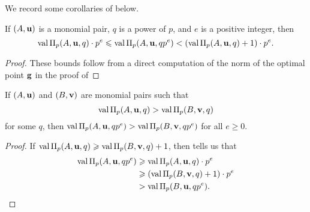 \documentclass[11pt]{amsart}
\begin{document}

We record some corollaries of  below.


\begin{corollary}
   \label{natural bounds: C}
   If $(A, \mathbf{u})$ is a monomial pair, $q$ is a power of $p$, and $e$ is a positive integer, then
   \[ \operatorname{val} \Pi_p(A, \mathbf{u}, q) \cdot p^e \leqslant \operatorname{val} \Pi_p(A, \mathbf{u}, qp^e) < (\operatorname{val} \Pi_p(A, \mathbf{u}, q) +1) \cdot p^e. \]
\end{corollary}
\begin{proof}
These bounds follow from a direct computation of the norm of the optimal point $\mathbf{g}$ in the proof of 
\end{proof}

\begin{corollary}
   \label{cor: mu comparison}
   If $(A, \mathbf{u})$ and $(B, \mathbf{v})$ are monomial pairs such that
   \[ \operatorname{val} \Pi_p(A, \mathbf{u}, q) > \operatorname{val} \Pi_p(B, \mathbf{v}, q)\]
   for some $q$, then $\operatorname{val} \Pi_p(A, \mathbf{u}, qp^e) > \operatorname{val} \Pi_p(B, \mathbf{v}, qp^e)$ for all $e \geq 0$.
\end{corollary}

\begin{proof}
   If $\operatorname{val} \Pi_p(A, \mathbf{u}, q) \geqslant \operatorname{val} \Pi_p(B, \mathbf{v}, q) + 1$, then  tells us that
   \begin{align*}
     \operatorname{val} \Pi_p(A, \mathbf{u}, qp^e)  &\geqslant \operatorname{val} \Pi_p(A, \mathbf{u}, q) \cdot p^e \\
                                  &\geqslant (\operatorname{val} \Pi_p(B, \mathbf{v}, q)+1)\cdot p^e \\
                                  & > \operatorname{val} \Pi_p(B, \mathbf{u}, qp^e). \qedhere
   \end{align*}
\end{proof}
\end{document}
